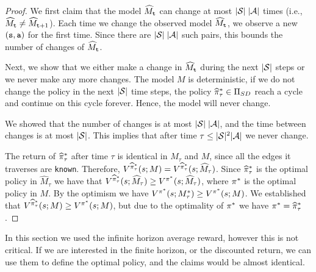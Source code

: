 \begin{proof}
We first claim that the model $\widehat{M}_{\tt t}$ can change  at
most $|\mathcal{S}|\;|\mathcal{A}|$ times (i.e.,  $\widehat{M}_{\tt t} \neq
\widehat{M}_{{\tt t}+1}$). Each time we change the observed model
$\widehat{M}_{\tt t}$, we observe a new $({\tt s},{\tt a})$ for the
first time. Since there are $|\mathcal{S}|\;|\mathcal{A}|$ such pairs, this
bounds the number of changes of  $\widehat{M}_{\tt t}$.

Next, we show that we either make a change in $\widehat{M}_{\tt t}$
during the next $|\mathcal{S}|$ steps or we never make any more changes.
The model $M$ is deterministic, if we do not change the policy in
the next $|\mathcal{S}|$ time steps, the policy
$\widehat{\pi}^*_\tau \in {\Pi _{SD}}$ reach a cycle and
continue on this cycle forever. Hence, the model will never change.

We showed that the number of changes is at most
$|\mathcal{S}|\;|\mathcal{A}|$, and the time between changes is at most
$|\mathcal{S}|$. This implies that after time $\tau\leq
|\mathcal{S}|^2|\mathcal{A}|$ we never change.

The return of $\widehat{\pi}^*_\tau$ after time $\tau$
is identical in $\widehat{M}_\tau$ and $M$, since all the edges
it traverses are \texttt{known}. Therefore, $V^{\widehat{\pi}^*_\tau}(s;M)=V^{\widehat{\pi}^*_\tau}(s;\widehat{M}_\tau)$. Since $\widehat{\pi}^*_\tau$ is the optimal policy in $\widehat{M}_\tau$ we have that $V^{\widehat{\pi}^*_\tau}(s;\widehat{M}_\tau)\geq V^{\pi^*}(s;\widehat{M}_\tau)$, where $\pi^*$ is the optimal policy in $M$. By the optimism we have $ V^{\pi^*}(s;M^*_\tau)\geq  V^{\pi^*}(s;M) $. We established that $ V^{\widehat{\pi}^*_\tau}(s;M) \geq V^{\pi^*}(s;M) $, but due to the optimality of $\pi^*$ we have $\pi^*=\widehat{\pi}^*_\tau$.
%
\end{proof}

In this section we used the infinite horizon average reward, however
this is not critical. If we are interested in the finite horizon, or
the discounted return, we can use them to define the optimal policy,
and the claims would be almost identical.


